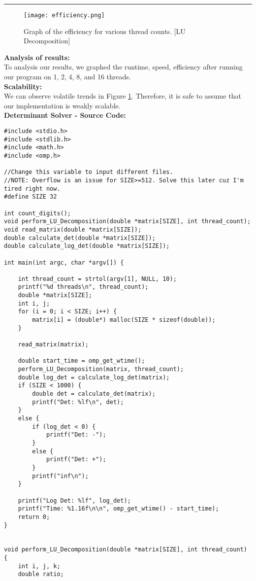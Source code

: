 \documentclass[letter, 12pt]{article}
\newenvironment{question}[1]{%
    \vspace{.2in}%
        \noindent{\bf #1}%
    \vspace{0.3em} \hrule \vspace{.1in}%
}{}
\begin{document}
\begin{question}{\large Finding the Determinant of a Matrix}
\begin{figure}[H]
  \centering
  \texttt{[image: efficiency.png]}
  \caption{Graph of the efficiency for various thread counts. [LU Decomposition]}
  \label{fig:efficiency}
\end{figure}

\textbf{Analysis of results:}\\

To analysis our results, we graphed the runtime, speed, efficiency after running our program on 1, 2, 4, 8, and 16 threads.\\

\textbf{Scalability:}\\

We can observe volatile trends in Figure \ref{fig:efficiency}. Therefore, it is safe to assume that our implementation is weakly scalable.\\

\newpage
\textbf{Determinant Solver - Source Code:}
\begin{lstlisting}[style=CStyle]
#include <stdio.h>
#include <stdlib.h>
#include <math.h>
#include <omp.h>

//Change this variable to input different files.
//NOTE: Overflow is an issue for SIZE>=512. Solve this later cuz I'm tired right now.
#define SIZE 32

int count_digits();
void perform_LU_Decomposition(double *matrix[SIZE], int thread_count);
void read_matrix(double *matrix[SIZE]);
double calculate_det(double *matrix[SIZE]);
double calculate_log_det(double *matrix[SIZE]);

int main(int argc, char *argv[]) {

	int thread_count = strtol(argv[1], NULL, 10);
	printf("%d threads\n", thread_count);
	double *matrix[SIZE];
	int i, j;
	for (i = 0; i < SIZE; i++) {
		matrix[i] = (double*) malloc(SIZE * sizeof(double));
	}

	read_matrix(matrix);

	double start_time = omp_get_wtime();
	perform_LU_Decomposition(matrix, thread_count);
	double log_det = calculate_log_det(matrix);
	if (SIZE < 1000) {
		double det = calculate_det(matrix);
		printf("Det: %lf\n", det);
	}
	else {
		if (log_det < 0) {
			printf("Det: -");
		} 
		else {
			printf("Det: +");
		}
		printf("inf\n");
	}
	
	printf("Log Det: %lf", log_det);
	printf("Time: %1.16f\n\n", omp_get_wtime() - start_time);
	return 0;
}


void perform_LU_Decomposition(double *matrix[SIZE], int thread_count) {
	int i, j, k;
	double ratio;
	

\end{lstlisting}
\end{question}
\end{document}
